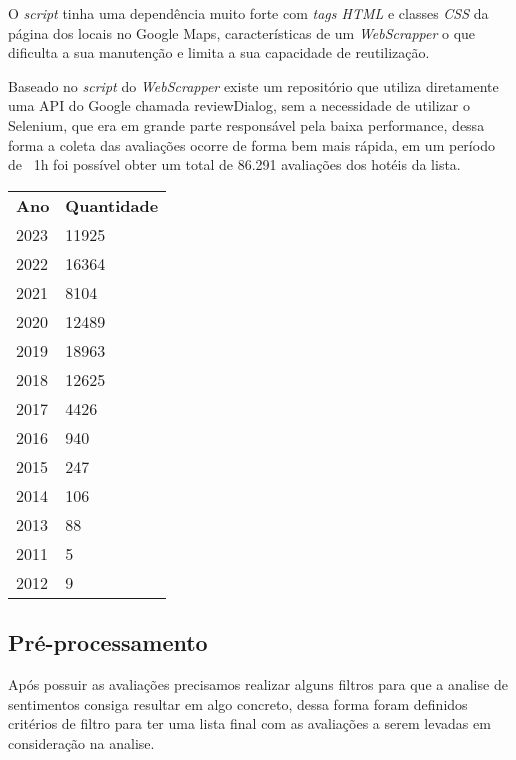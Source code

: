 O \emph{script} tinha uma dependência muito forte com \emph{tags HTML} e classes \emph{CSS} da página dos locais no Google Maps, características de um \emph{WebScrapper} o que dificulta a sua manutenção e limita a sua capacidade de reutilização.

Baseado no \emph{script} do \emph{WebScrapper} existe um repositório que utiliza diretamente uma API do Google chamada reviewDialog, sem a necessidade de utilizar o Selenium, que era em grande parte responsável pela baixa performance, dessa forma a coleta das avaliações ocorre de forma bem mais rápida, em um período de ~1h foi possível obter um total de 86.291 avaliações dos hotéis da lista.

\begin{table}[H]
	\centering
	\begin{tabular}{l|l}
		\textbf{Ano} & \textbf{Quantidade} \\
		2023         & 11925               \\
		2022         & 16364               \\
		2021         & 8104                \\
		2020         & 12489               \\
		2019         & 18963               \\
		2018         & 12625               \\
		2017         & 4426                \\
		2016         & 940                 \\
		2015         & 247                 \\
		2014         & 106                 \\
		2013         & 88                  \\
		2011         & 5                   \\
		2012         & 9
	\end{tabular}%
\end{table}

\subsection{Pré-processamento}
\label{subsec:pre_processamento}

Após possuir as avaliações precisamos realizar alguns filtros para que a analise de sentimentos consiga resultar em algo concreto, dessa forma foram definidos critérios de filtro para ter uma lista final com as avaliações a serem levadas em consideração na analise.

